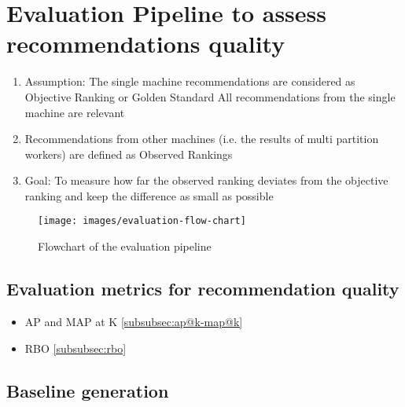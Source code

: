 \section{Evaluation Pipeline to assess recommendations quality}
\label{sec:evaluation-pipeline}

\begin{enumerate}
    \item Assumption: The single machine recommendations are considered as Objective Ranking or Golden Standard
    All recommendations from the single machine are relevant
    
    \item Recommendations from other machines (i.e. the results of multi partition workers) are defined as Observed Rankings
    
    \item Goal: To measure how far the observed ranking deviates from the objective ranking and keep the difference as small as possible
\end{enumerate}

\begin{figure}[!h]
	\centering
	\texttt{[image: images/evaluation-flow-chart]}
	\caption{Flowchart of the evaluation pipeline}
	\label{fig:flowchart-evaluation-pipeline}
\end{figure}


\subsection{Evaluation metrics for recommendation quality}
\label{subsec:evaluation-metrics-for-recommendation-quality}

\begin{itemize}
    \item AP and MAP at K \ref{subsubsec:ap@k-map@k}
    \item RBO \ref{subsubsec:rbo}
\end{itemize}


\subsection{Baseline generation}
\label{subsec:baseline-generation}

